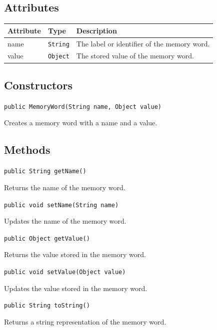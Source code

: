 \documentclass[12pt,a4paper]{article}
\begin{document}
\subsection{Attributes}

\begin{tabularx}{\textwidth}{p{4cm} p{3cm} Y}
\toprule
\textbf{Attribute} & \textbf{Type} & \textbf{Description} \\
\midrule
name & \texttt{String} & The label or identifier of the memory word. \\
value & \texttt{Object} & The stored value of the memory word. \\
\bottomrule
\end{tabularx}

\subsection{Constructors}

\begin{signaturebox}
\texttt{public MemoryWord(String name, Object value)}
\end{signaturebox}

Creates a memory word with a name and a value.

\subsection{Methods}

\begin{signaturebox}
\texttt{public String getName()}
\end{signaturebox}
Returns the name of the memory word.

\begin{signaturebox}
\texttt{public void setName(String name)}
\end{signaturebox}
Updates the name of the memory word.

\begin{signaturebox}
\texttt{public Object getValue()}
\end{signaturebox}
Returns the value stored in the memory word.

\begin{signaturebox}
\texttt{public void setValue(Object value)}
\end{signaturebox}
Updates the value stored in the memory word.

\begin{signaturebox}
\texttt{public String toString()}
\end{signaturebox}
Returns a string representation of the memory word.
\end{document}

